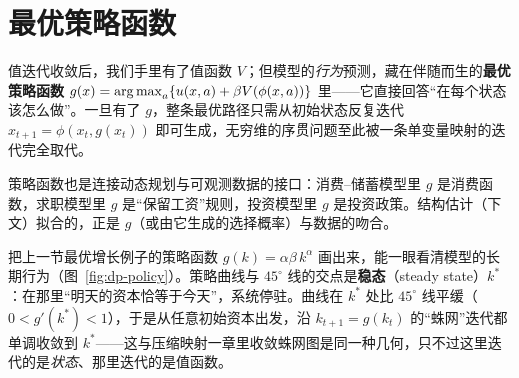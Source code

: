 
\section{最优策略函数}
\label{sec:dp-policy}

值迭代收敛后，我们手里有了值函数 $V$；但模型的\emph{行为}预测，藏在伴随而生的\textbf{最优策略函数} $g(x)=\operatorname*{arg\,max}_a\{u(x,a)+\beta V(\phi(x,a))\}$ 里——它直接回答``在每个状态该怎么做''。一旦有了 $g$，整条最优路径只需从初始状态反复迭代 $x_{t+1}=\phi(x_t,g(x_t))$ 即可生成，无穷维的序贯问题至此被一条单变量映射的迭代完全取代。

策略函数也是连接动态规划与可观测数据的接口：消费--储蓄模型里 $g$ 是消费函数，求职模型里 $g$ 是``保留工资''规则，投资模型里 $g$ 是投资政策。结构估计（下文）拟合的，正是 $g$（或由它生成的选择概率）与数据的吻合。

把上一节最优增长例子的策略函数 $g(k)=\alpha\beta\,k^{\alpha}$ 画出来，能一眼看清模型的长期行为（图~\ref{fig:dp-policy}）。策略曲线与 $45^\circ$ 线的交点是\textbf{稳态}（steady state）$k^{*}$：在那里``明天的资本恰等于今天''，系统停驻。曲线在 $k^*$ 处比 $45^\circ$ 线平缓（$0<g'(k^*)<1$），于是从任意初始资本出发，沿 $k_{t+1}=g(k_t)$ 的``蛛网''迭代都单调收敛到 $k^{*}$——这与压缩映射一章里收敛蛛网图是同一种几何，只不过这里迭代的是\emph{状态}、那里迭代的是值函数。

